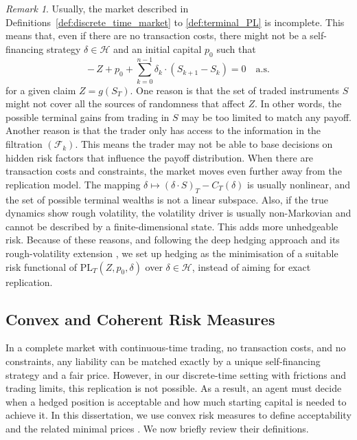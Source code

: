\documentclass[12pt,a4paper]{article}
\theoremstyle{definition}
\theoremstyle{plain}
\theoremstyle{remark}
\newtheorem{remark}{Remark}[section]
\theoremstyle{plain}
\begin{document}
\begin{remark}
\label{rem:incomplete_market}
Usually, the market described in Definitions~\ref{def:discrete_time_market} to \ref{def:terminal_PL} is incomplete.
This means that, even if there are no transaction costs, there might not be a self-financing strategy $\delta\in\mathcal H$ and an initial capital $p_0$ such that
\[
-\,Z + p_0 + \sum_{k=0}^{n-1}\delta_k\cdot(S_{k+1}-S_k)=0
\quad\text{a.s.}
\]
for a given claim $Z=g(S_T)$.
One reason is that the set of traded instruments $S$ might not cover all the sources of randomness that affect $Z$. In other words, the possible terminal gains from trading in $S$ may be too limited to match any payoff.
Another reason is that the trader only has access to the information in the filtration $(\mathcal F_k)$. This means the trader may not be able to base decisions on hidden risk factors that influence the payoff distribution.
When there are transaction costs and constraints, the market moves even further away from the replication model. The mapping $\delta\mapsto (\delta\cdot S)_T - C_T(\delta)$ is usually nonlinear, and the set of possible terminal wealths is not a linear subspace.
Also, if the true dynamics show rough volatility, the volatility driver is usually non-Markovian and cannot be described by a finite-dimensional state. This adds more unhedgeable risk.
Because of these reasons, and following the deep hedging approach \cite{Buehler2019DeepHedging} and its rough-volatility extension \cite{Horvath2021DeepRough}, we set up hedging as the minimisation of a suitable risk functional of $\mathrm{PL}_T(Z,p_0,\delta)$ over $\delta\in\mathcal H$, instead of aiming for exact replication.


\end{remark}

\subsection{Convex and Coherent Risk Measures}
\label{subsec:convex_risk_measures}

In a complete market with continuous-time trading, no transaction costs, and no constraints, any liability can be matched exactly by a unique self-financing strategy and a fair price. However, in our discrete-time setting with frictions and trading limits, this replication is not possible. As a result, an agent must decide when a hedged position is acceptable and how much starting capital is needed to achieve it. In this dissertation, we use convex risk measures to define acceptability and the related minimal prices \cite{Xu2006,Ilhan2009,KloeppelSchweizer2007,FoellmerSchied2016}. We now briefly review their definitions.
\end{document}
